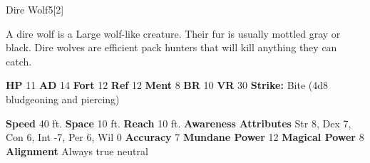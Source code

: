   
  \begin{monsection}{Dire Wolf}{5}[2]
    \vspace{-1em}\vspace{-1em}
    \vspace{0em}

    
        A dire wolf is a Large wolf-like creature.
        Their fur is usually mottled gray or black.
        Dire wolves are efficient pack hunters that will kill anything they can catch.
      

    \begin{spellcontent}
      \begin{spelltargetinginfo}
        \pari \textbf{HP} 11 \monsep
          \textbf{AD} 14 \monsep
          \textbf{Fort} 12 \monsep
          \textbf{Ref} 12 \monsep
          \textbf{Ment} 8
        \pari \textbf{BR} 10 \monsep
        \textbf{VR} 30
        \pari \textbf{Strike:}
            Bite  (4d8 bludgeoning and piercing)
      \end{spelltargetinginfo}
    \end{spellcontent}
    \begin{monsterfooter}
      \pari \textbf{Speed} 40 ft. \monsep
        \textbf{Space} 10 ft. \monsep
        \textbf{Reach} 10 ft.
      \pari \textbf{Awareness} 
      \pari \textbf{Attributes}
        Str 8, Dex 7,
        Con 6, Int -7,
        Per 6, Wil 0
      \pari \textbf{Accuracy} 7 \monsep
        \textbf{Mundane Power} 12 \monsep
      \textbf{Magical Power} 8
      \pari \textbf{Alignment} Always true neutral
    \end{monsterfooter}
  \end{monsection}
  
